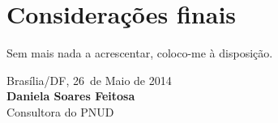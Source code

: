 \documentclass[[a4paper,11pt]{article}
\newcommand{\MyName}{Daniela Soares Feitosa}
\newcommand{\MesEntrega}{Maio de 2014}
\newcommand{\DiaEntrega}{26}
\begin{document}
\newpage

\section{Considerações finais}


\vspace{1cm}

Sem mais nada a acrescentar, coloco-me à disposição.

\vspace{1cm}

\begin{minipage}{\textwidth}
  Brasília/DF, \DiaEntrega \ de \MesEntrega\\[1cm]
  \textbf{\MyName}\\
  \small Consultora do PNUD
\end{minipage}

\newpage
\appendix
\appendixpage

\end{document}
